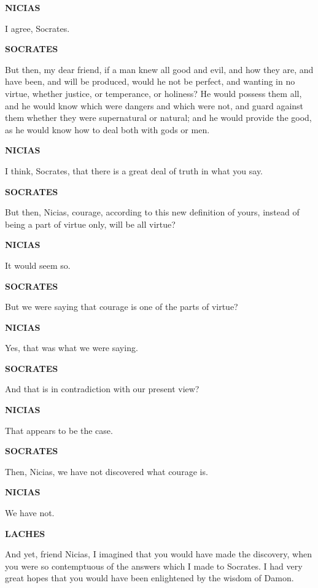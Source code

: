 \documentclass[11pt,letter]{article}
\begin{document}
\par \textbf{NICIAS}
\par   I agree, Socrates.

\par \textbf{SOCRATES}
\par   But then, my dear friend, if a man knew all good and evil, and how they are, and have been, and will be produced, would he not be perfect, and wanting in no virtue, whether justice, or temperance, or holiness? He would possess them all, and he would know which were dangers and which were not, and guard against them whether they were supernatural or natural; and he would provide the good, as he would know how to deal both with gods or men.

\par \textbf{NICIAS}
\par   I think, Socrates, that there is a great deal of truth in what you say.

\par \textbf{SOCRATES}
\par   But then, Nicias, courage, according to this new definition of yours, instead of being a part of virtue only, will be all virtue?

\par \textbf{NICIAS}
\par   It would seem so.

\par \textbf{SOCRATES}
\par   But we were saying that courage is one of the parts of virtue?

\par \textbf{NICIAS}
\par   Yes, that was what we were saying.

\par \textbf{SOCRATES}
\par   And that is in contradiction with our present view?

\par \textbf{NICIAS}
\par   That appears to be the case.

\par \textbf{SOCRATES}
\par   Then, Nicias, we have not discovered what courage is.

\par \textbf{NICIAS}
\par   We have not.

\par \textbf{LACHES}
\par   And yet, friend Nicias, I imagined that you would have made the discovery, when you were so contemptuous of the answers which I made to Socrates. I had very great hopes that you would have been enlightened by the wisdom of Damon.
\end{document}
